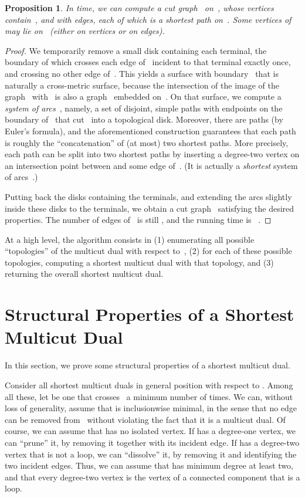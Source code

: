 \documentclass[11pt]{article}
\theoremstyle{plain}  \newtheorem{theorem}{Theorem}[section]
\newtheorem{proposition}[theorem]{Proposition}
\theoremstyle{definition}
\begin{document}
\begin{proposition}\label{P:cutgraph}
  In  time, we can compute a cut graph~ on~, whose
   vertices contain~, and with  edges, each of which is
  a shortest path on~.  Some vertices of~ may lie on~ (either on
  vertices or on edges).
\end{proposition}
\begin{proof}
  We temporarily remove a small disk containing each terminal, the boundary
  of which crosses each edge of~ incident to that terminal exactly once,
  and crossing no other edge of~.  This yields a surface with
  boundary~ that is naturally a cross-metric surface, because the
  intersection of the image of the graph~ with~ is also a graph~
  embedded on~.  On that surface, we compute a \emph{system of
    arcs}~\cite[Section~5.1]{ccelw-scsh-08}, namely, a set of disjoint,
  simple paths with endpoints on the boundary of~ that cut~ into a
  topological disk.  Moreover, there are  paths (by Euler's
  formula), and the aforementioned construction guarantees that each path
  is roughly the ``concatenation'' of (at most) two shortest paths.  More
  precisely, each path can be split into two shortest paths by inserting a
  degree-two vertex on an intersection point between  and some edge
  of~.  (It is actually a \emph{shortest} system of
  arcs~\cite[Conclusion]{c-scgsp-10}.)

  Putting back the disks containing the terminals, and extending the arcs
  slightly inside these disks to the terminals, we obtain a cut graph~
  satisfying the desired properties.  The number of edges of~ is still
  , and the running time is
  ~\cite{ccelw-scsh-08}.
\end{proof}

At a high level, the algorithm consists in (1) enumerating all possible
``topologies'' of the multicut dual with respect to~, (2) for each of
these possible topologies, computing a shortest multicut dual with that
topology, and (3) returning the overall shortest multicut dual.

\section{Structural Properties of a Shortest Multicut Dual}\label{S:struct}

In this section, we prove some structural properties of a shortest multicut
dual.

Consider all shortest multicut duals in general position with respect to
.  Among all these, let  be one that crosses~ a minimum
number of times.  We can, without loss of generality, assume that  is
inclusionwise minimal, in the sense that no edge can be removed from~
without violating the fact that it is a multicut dual.  Of course, we can
assume that  has no isolated vertex.  If  has a degree-one
vertex, we can ``prune'' it, by removing it together with its incident
edge.  If  has a degree-two vertex that is not a loop, we can
``dissolve'' it, by removing it and identifying the two incident edges.
Thus, we can assume that  has minimum degree at least two, and that
every degree-two vertex is the vertex of a connected component that is a
loop.
\end{document}

